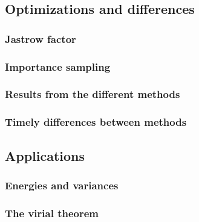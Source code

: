 \subsection{Optimizations and differences}

\subsubsection{Jastrow factor}

\subsubsection{Importance sampling}

\subsubsection{Results from the different methods}

\subsubsection{Timely differences between methods}






\subsection{Applications}

\subsubsection{Energies and variances}

\subsubsection{The virial theorem }